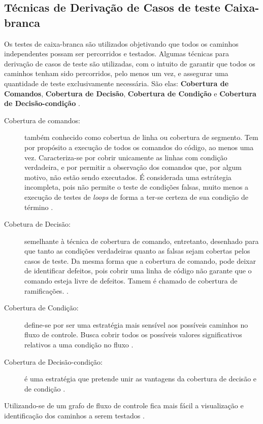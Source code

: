 \subsection{Técnicas de Derivação de Casos de teste Caixa-branca}
Os testes de caixa-branca são utilizados objetivando que todos os caminhos independentes possam ser percorridos e testados. Algumas técnicas para derivação de casos de teste são utilizadas, com o intuito de garantir que todos os caminhos tenham sido percorridos, pelo menos um vez, e assegurar uma quantidade de teste exclusivamente necessária. São elas: \textbf{Cobertura de Comandos}, \textbf{Cobertura de Decisão}, \textbf{Cobertura de Condição} e \textbf{Cobertura de Decisão-condição} \cite{istqb2014}.

\begin{description}
\item[Cobertura de comandos:] também conhecido como cobertua de linha ou cobertura de segmento. Tem por propósito a execução de todos os comandos do código, ao menos uma vez. Caracteriza-se por cobrir unicamente as linhas com condição verdadeira, e por permitir a observação dos comandos que, por algum motivo, não estão sendo executados. É considerada uma estrátegia incompleta, pois não permite o teste de condições falsas, muito menos a execução de testes de \textit{loops} de forma a ter-se certeza de sua condição de término \cite{istqb2014}.
\item[Cobetura de Decisão:] semelhante à técnica de cobertura de comando, entretanto, desenhado para que tanto as condições verdadeiras quanto as falsas sejam cobertas pelos casos de teste. Da mesma forma que a cobertura de comando, pode deixar de identificar defeitos, pois cobrir uma linha de código não garante que o comando esteja livre de defeitos. Tamem é chamado de cobertura de ramificações. \cite{istqb2014}.
\item[Cobertura de Condição:] define-se por ser uma estratégia mais sensível aos possíveis caminhos no fluxo de controle. Busca cobrir todos os possíveis valores significativos relativos a uma condição no fluxo \cite{istqb2014}.
\item[Cobertura de Decisão-condição:] é uma estratégia que pretende unir as vantagens da cobertura de decisão e de condição \cite{istqb2014}.
\end{description}
\par
\indent Utilizando-se de um grafo de fluxo de controle fica mais fácil a visualização e identificação dos caminhos a serem testados \cite{copeland2003}.

